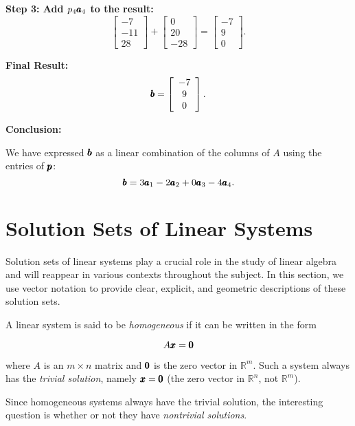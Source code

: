 \begin{solution}
    \textbf{Step 3: Add $p_4 \pmb{a}_4$ to the result:}
    \[
    \left[\begin{array}{c}
    -7 \\
    -11 \\
    28
    \end{array}\right] + \left[\begin{array}{c}
    0 \\
    20 \\
    -28
    \end{array}\right] = \left[\begin{array}{c}
    -7 \\
    9 \\
    0
    \end{array}\right].
    \]
    
    \textbf{Final Result:}
    \[
    \pmb{b} = \left[\begin{array}{c}
    -7 \\
    9 \\
    0
    \end{array}\right].
    \]
    
    \textbf{Conclusion:}
    
    We have expressed $\pmb{b}$ as a linear combination of the columns of $A$ using the entries of $\pmb{p}$:
    \[
    \pmb{b} = 3 \pmb{a}_1 - 2 \pmb{a}_2 + 0 \pmb{a}_3 - 4 \pmb{a}_4.
    \]
\end{solution}

\section{Solution Sets of Linear Systems}
Solution sets of linear systems play a crucial role in the study of linear algebra and will reappear in various contexts throughout the subject. In this section, we use vector notation to provide clear, explicit, and geometric descriptions of these solution sets.

A linear system is said to be \textit{homogeneous} if it can be written in the form

\[
A \pmb{x} = \pmb{0}
\]

where $A$ is an $m \times n$ matrix and $\pmb{0}$ is the zero vector in $\mathbb{R}^m$. Such a system always has the \textit{trivial solution}, namely $\pmb{x} = \pmb{0}$ (the zero vector in $\mathbb{R}^n$, not $\mathbb{R}^m$).

Since homogeneous systems always have the trivial solution, the interesting question is whether or not they have \textit{nontrivial solutions}.

